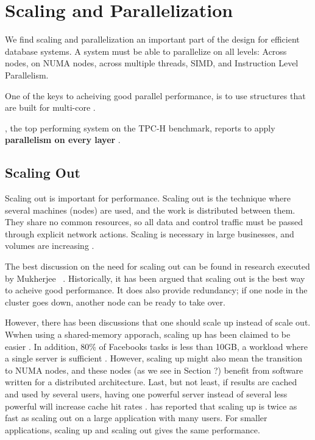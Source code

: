 \chapter{Scaling and Parallelization}
\label{chap:Scaling and Parallelization}
We find scaling and parallelization an important part of the design for efficient database systems. A system must be able to parallelize on all levels: Across nodes, on NUMA nodes, across multiple threads, SIMD, and Instruction Level Parallelism. 

One of the keys to acheiving good parallel performance, is to use structures that are built for multi-core \cite{Primsch2011-ij}.

\exasol, the top performing system on the TPC-H benchmark, reports to apply \textbf{parallelism on every layer} \cite{Exasol2014-xh}.

\newpage
\section{Scaling Out}
\label{sec:Scaling Out}
Scaling out is important for performance. Scaling out is the technique where several machines (nodes) are used, and the work is distributed between them. They share no common resources, so all data and control traffic must be passed through explicit network actions. Scaling is necessary in large businesses, and volumes are increasing \cite{Qlik2012-ku}.

The best discussion on the need for scaling out can be found in research executed by Mukherjee \ea~\cite{Mukherjee2015-ul}. Historically, it has been argued that scaling out is the best way to acheive good performance. It does also provide redundancy; if one node in the cluster goes down, another node can be ready to take over.

However, there has been discussions that one should scale up instead of scale out. Wwhen using a shared-memory apporach, scaling up has been claimed to be easier \cite{Boncz2002-yj}. In addition, 80\% of Facebooks tasks is less than 10GB, a workload where a single server is sufficient \cite{Mukherjee2015-ul}. However, scaling up might also mean the transition to NUMA nodes, and these nodes (as we see in Section ?) benefit from software written for a distributed architecture. Last, but not least, if results are cached and used by several users, having one powerful server instead of several less powerful will increase cache hit rates \cite{qlik2012-ku}. \qlikview has reported that scaling up is twice as fast as scaling out on a large application with many users. For smaller applications, scaling up and scaling out gives the same performance.



